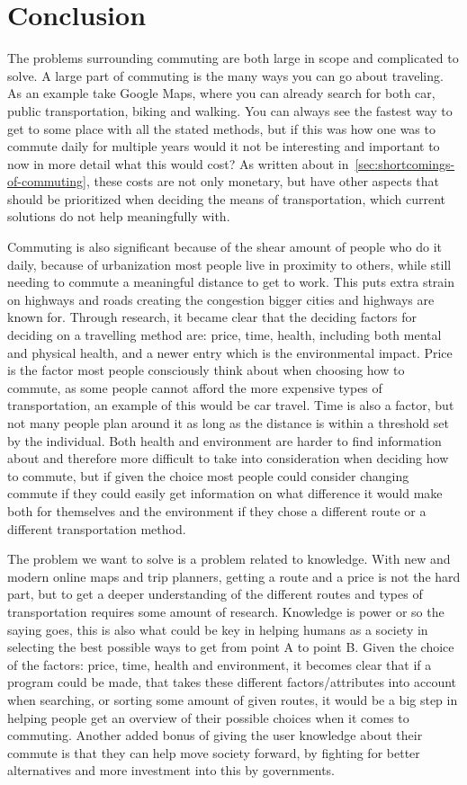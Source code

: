 \chapter{Conclusion}\label{ch:conclusion}
The problems surrounding commuting are both large in scope and complicated to solve.
A large part of commuting is the many ways you can go about traveling.
As an example take Google Maps, where you can already search for both car, public transportation, biking and walking.
You can always see the fastest way to get to some place with all the stated methods, but if this was how one was to
commute daily for multiple years would it not be interesting and important to now in more detail what this would cost?
As written about in~\ref{sec:shortcomings-of-commuting}, these costs are not only monetary, but have other
aspects that should be prioritized when deciding the means of transportation, which current solutions do not help
meaningfully with.

Commuting is also significant because of the shear amount of people who do it daily, because of urbanization most people
live in proximity to others, while still needing to commute a meaningful distance to get to work.
This puts extra strain on highways and roads creating the congestion bigger cities and highways are known for.
Through research, it became clear that the deciding factors for deciding on a travelling method are: price, time,
health, including both mental and physical health, and a newer entry which is the environmental impact.
Price is the factor most people consciously think about when choosing how to commute, as some people cannot afford the
more expensive types of transportation, an example of this would be car travel.
Time is also a factor, but not many people plan around it as long as the distance is within a threshold set by the
individual.
Both health and environment are harder to find information about and therefore more difficult to take into consideration
when deciding how to commute, but if given the choice most people could consider changing commute if they could easily
get information on what difference it would make both for themselves and the environment if they chose a different route
or a different transportation method.

The problem we want to solve is a problem related to knowledge.
With new and modern online maps and trip planners, getting a route and a price is not the hard part, but to get a deeper
understanding of the different routes and types of transportation requires some amount of research.
Knowledge is power or so the saying goes, this is also what could be key in helping humans as a society in selecting
the best possible ways to get from point A to point B\@.
Given the choice of the factors: price, time, health and environment, it becomes clear that if a program could be made,
that takes these different factors/attributes into account when searching, or sorting some amount of given routes, it
would be a big step in helping people get an overview of their possible choices when it comes to commuting.
Another added bonus of giving the user knowledge about their commute is that they can help move society forward, by
fighting for better alternatives and more investment into this by governments.
